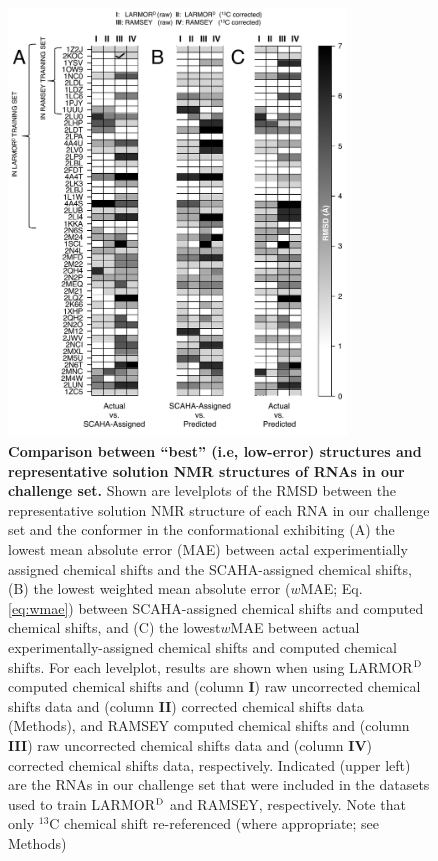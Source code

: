 \documentclass[journal=jcisd8,manuscript=article,layout=onecolumn]{achemso}
\begin{document}
\begin{figure}[h!]
  \centering
       \includegraphics[width=0.8\textwidth]{figure_2}
  \caption{\textbf{Comparison between ``best'' (i.e, low-error) structures and representative solution NMR structures of RNAs in our challenge set.} Shown are levelplots of the RMSD between the representative solution NMR structure of each RNA in our challenge set and the conformer in the conformational exhibiting (A) the lowest mean absolute error (MAE) between actal experimentially assigned chemical shifts and the SCAHA-assigned chemical shifts, (B)   the lowest weighted mean absolute error ($w$MAE; Eq. \ref{eq:wmae}) between SCAHA-assigned chemical shifts and computed chemical shifts, and (C) the lowest$w$MAE between actual experimentally-assigned chemical shifts and computed chemical shifts. For each levelplot, results are shown when using LARMOR$^{\rm D}$ computed chemical shifts  and (column \textbf{I}) raw uncorrected chemical shifts data and  (column \textbf{II}) corrected chemical shifts data (Methods), and RAMSEY computed chemical shifts  and (column \textbf{III}) raw uncorrected chemical shifts data and  (column \textbf{IV}) corrected chemical shifts data, respectively. Indicated (upper left) are the RNAs in our challenge set that were included in the datasets used to train LARMOR$^{\rm D}$ and RAMSEY, respectively. Note that only $^{13}$C chemical shift re-referenced (where appropriate; see Methods)}
  \label{fig:levelplot}
\end{figure}
\end{document}
